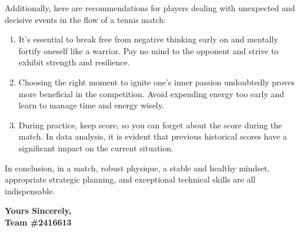 Additionally, here are recommendations for players dealing with unexpected and decisive events in the flow of a tennis match:
\begin{enumerate}
\item  It's essential to break free from negative thinking early on and mentally fortify oneself like a warrior. Pay no mind to the opponent and strive to exhibit strength and resilience.

\item  Choosing the right moment to ignite one's inner passion undoubtedly proves more beneficial in the competition. Avoid expending energy too early and learn to manage time and energy wisely.

\item  During practice, keep score, so you can forget about the score during the match. In data analysis, it is evident that previous historical scores have a significant impact on the current situation. 
\end{enumerate}

In conclusion, in a match, robust physique, a stable and healthy mindset, appropriate strategic planning, and exceptional technical skills are all indispensable.

\begin{flushright}
    \textbf{Yours Sincerely,} \\
    \textbf{Team \#2416613}
\end{flushright}
